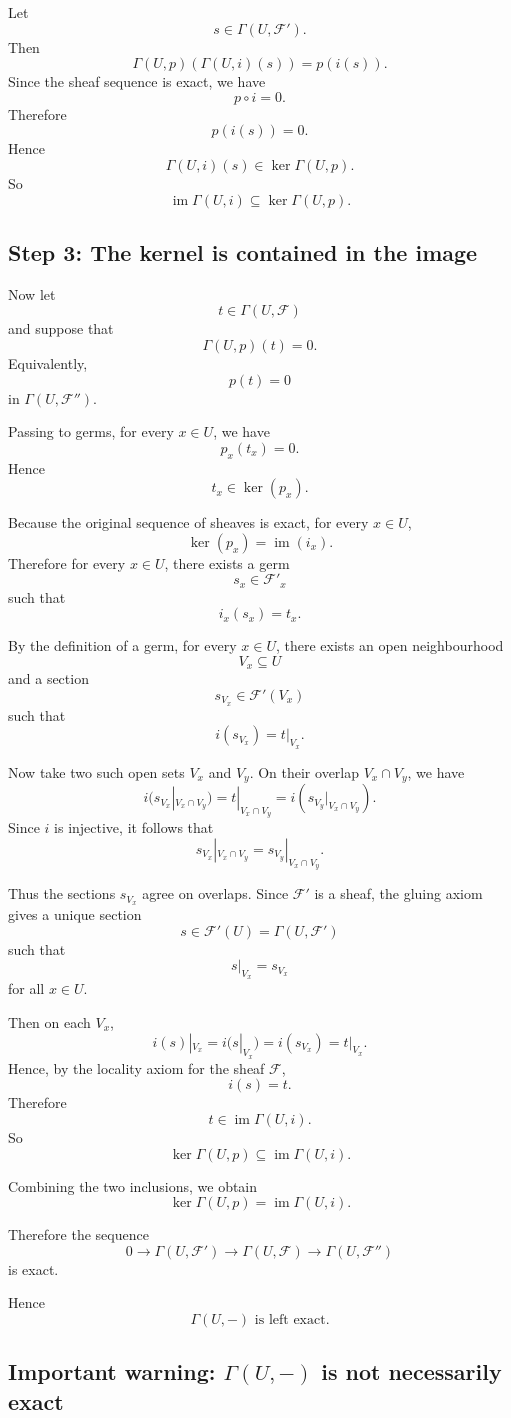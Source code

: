 \documentclass[12pt,a4paper]{article}
\DeclareMathOperator{\im}{im}
\newcommand{\F}{\mathcal F}
\theoremstyle{notespace}
\newcommand{\Fp}{\mathcal F'}      %
\newcommand{\Fpp}{\mathcal F''}
\begin{document}
Let
\[
s\in \Gamma(U,\Fp).
\]
Then
\[
\Gamma(U,p)(\Gamma(U,i)(s))
=
p(i(s)).
\]
Since the sheaf sequence is exact, we have
\[
p\circ i=0.
\]
Therefore
\[
p(i(s))=0.
\]
Hence
\[
\Gamma(U,i)(s)\in \ker \Gamma(U,p).
\]
So
\[
\im \Gamma(U,i)\subseteq \ker \Gamma(U,p).
\]

\subsection{Step 3: The kernel is contained in the image}

Now let
\[
t\in \Gamma(U,\F)
\]
and suppose that
\[
\Gamma(U,p)(t)=0.
\]
Equivalently,
\[
p(t)=0
\]
in \(\Gamma(U,\Fpp)\).

Passing to germs, for every \(x\in U\), we have
\[
p_x(t_x)=0.
\]
Hence
\[
t_x\in \ker(p_x).
\]

Because the original sequence of sheaves is exact, for every \(x\in U\),
\[
\ker(p_x)=\im(i_x).
\]
Therefore for every \(x\in U\), there exists a germ
\[
s_x\in \Fp_x
\]
such that
\[
i_x(s_x)=t_x.
\]

By the definition of a germ, for every \(x\in U\), there exists an open neighbourhood
\[
V_x\subseteq U
\]
and a section
\[
s_{V_x}\in \Fp(V_x)
\]
such that
\[
i(s_{V_x})=t|_{V_x}.
\]

Now take two such open sets \(V_x\) and \(V_y\). On their overlap \(V_x\cap V_y\), we have
\[
i(s_{V_x}|_{V_x\cap V_y})
=
t|_{V_x\cap V_y}
=
i(s_{V_y}|_{V_x\cap V_y}).
\]
Since \(i\) is injective, it follows that
\[
s_{V_x}|_{V_x\cap V_y}
=
s_{V_y}|_{V_x\cap V_y}.
\]

Thus the sections \(s_{V_x}\) agree on overlaps. Since \(\Fp\) is a sheaf, the gluing axiom gives a unique section
\[
s\in \Fp(U)=\Gamma(U,\Fp)
\]
such that
\[
s|_{V_x}=s_{V_x}
\]
for all \(x\in U\).

Then on each \(V_x\),
\[
i(s)|_{V_x}
=
i(s|_{V_x})
=
i(s_{V_x})
=
t|_{V_x}.
\]
Hence, by the locality axiom for the sheaf \(\F\),
\[
i(s)=t.
\]
Therefore
\[
t\in \im \Gamma(U,i).
\]
So
\[
\ker \Gamma(U,p)\subseteq \im \Gamma(U,i).
\]

Combining the two inclusions, we obtain
\[
\ker \Gamma(U,p)=\im \Gamma(U,i).
\]

Therefore the sequence
\[
0\longrightarrow \Gamma(U,\Fp)
\longrightarrow \Gamma(U,\F)
\longrightarrow \Gamma(U,\Fpp)
\]
is exact.

Hence
\[
\boxed{
	\Gamma(U,-)\text{ is left exact.}
}
\]

\subsection{Important warning: \(\Gamma(U,-)\) is not necessarily exact}
\end{document}
